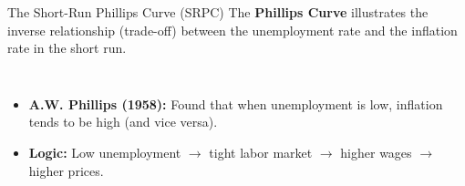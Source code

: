 \documentclass[aspectratio=169]{beamer}
\begin{document}
\begin{frame}{The Short-Run Phillips Curve (SRPC)}
    The \textbf{Phillips Curve} illustrates the inverse relationship (trade-off) between the unemployment rate and the inflation rate in the short run.
    
    \begin{columns}
        \begin{itemize}
            \item \textbf{A.W. Phillips (1958):} Found that when unemployment is low, inflation tends to be high (and vice versa).
            \item \textbf{Logic:} Low unemployment $\rightarrow$ tight labor market $\rightarrow$ higher wages $\rightarrow$ higher prices.
        \end{itemize}
        
    \end{columns}
\end{frame}
\end{document}
